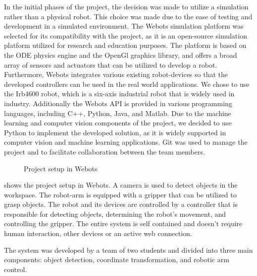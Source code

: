 In the initial phases of the project, the decision was made to utilize a simulation rather than a physical robot. This choice was made due to the ease of testing and development in a simulated environment. The Webots simulation platform was selected for its compatibility with the project, as it is an open-source simulation platform utilized for research and education purposes. The platform is based on the ODE physics engine and the OpenGl graphics library, and offers a broad array of sensors and actuators that can be utilized to develop a robot. Furthermore, Webots integrates various existing robot-devices so that the developed controllers can be used in the real world applications. We chose to use the Irb4600 robot, which is a six-axis industrial robot that is widely used in industry. Additionally the Webots API is provided in various programming languages, including C++, Python, Java, and Matlab. Due to the machine learning and computer vision components of the project, we decided to use Python to implement the developed solution, as it is widely supported in computer vision and machine learning applications. Git was used to manage the project and to facilitate collaboration between the team members.


\begin{figure}[!h]
    \centering
    \caption{Project setup in Webots }
    \label{fig:project_setup}
\end{figure}

 shows the project setup in Webots. A camera is used to detect objects in the workspace. The robot-arm is equipped with a gripper that can be utilized to grasp objects. The robot and its devices are controlled by a controller that is responsible for detecting objects, determining the robot's movement, and controlling the gripper. The entire system is self contained and doesn't require human interaction, other devices or an active web connection.

The system was developed by a team of two students and divided into three main components: object detection, coordinate transformation, and robotic arm control. 

